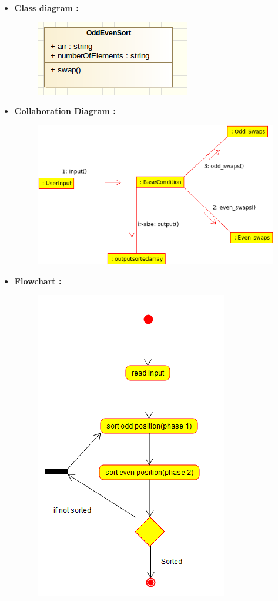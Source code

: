 \documentclass[a4paper,12pt]{article}
\begin{document}
\begin{itemize}
\item \textbf{Class diagram :}
\begin{figure}[h!]
		\centering
		\includegraphics[scale=0.5]{oddEven.png}
	\end{figure}
\item \textbf{Collaboration Diagram :}\\
\begin{figure}[h!]
		\centering
		\includegraphics[scale=0.5]{oddevencoll.png}
	\end{figure}
\newpage
\item \textbf{Flowchart :}\\
\bigskip

\begin{figure}[h!]
		\centering
		\includegraphics[scale=0.5]{odd-even-activity}
	\end{figure}





\end{itemize}
\end{document}

